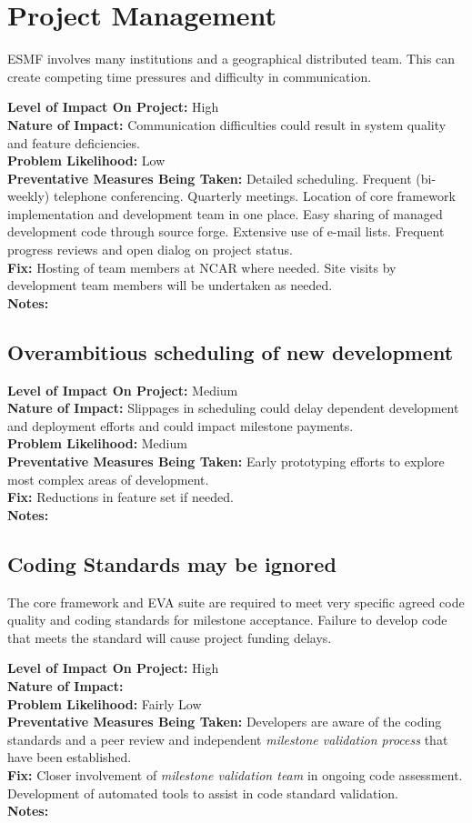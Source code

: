 \documentclass[english]{article}
\newcommand{\req}[1]{\section{\hspace{.2in}#1}}
\newcommand{\sreq}[1]{\subsection{\hspace{.2in}#1}}
\newenvironment
{reqlist}
{\begin{list} {} {} \rm \item[]}
{\end{list}}
\begin{document}
\req{Project Management}
ESMF involves many institutions and a geographical distributed team. 
This can create competing time pressures and difficulty in communication.

\begin{reqlist}
{\bf Level of Impact On Project:} High \\
{\bf Nature of Impact:} Communication difficulties could result in system quality and feature deficiencies. \\
{\bf Problem Likelihood:} Low \\
{\bf Preventative Measures Being Taken:} Detailed scheduling. Frequent (bi-weekly) telephone
conferencing. Quarterly meetings. Location of core framework implementation and development
team in one place. Easy sharing of managed development code through source forge. 
Extensive use of e-mail lists. Frequent progress reviews and open dialog on project status.
\\
{\bf Fix:} Hosting of team members at NCAR where needed.
Site visits by development team members will be undertaken as needed.
\\
{\bf Notes:} 
\end{reqlist}

\sreq{Overambitious scheduling of new development}
\begin{reqlist}
{\bf Level of Impact On Project:} Medium \\
{\bf Nature of Impact:} Slippages in scheduling could delay dependent development and deployment efforts and could impact milestone payments.  \\
{\bf Problem Likelihood:} Medium \\
{\bf Preventative Measures Being Taken:} Early prototyping efforts to explore most
complex areas of development.
\\
{\bf Fix:} Reductions in feature set if needed.
\\
{\bf Notes:} 
\end{reqlist}


\sreq{Coding Standards may be ignored}
The core framework and EVA suite are required to meet very specific agreed code quality and coding
standards for milestone acceptance. Failure to develop code that meets the
standard will cause project funding delays.
\begin{reqlist}
{\bf Level of Impact On Project:} High \\
{\bf Nature of Impact:} \\
{\bf Problem Likelihood:} Fairly Low \\
{\bf Preventative Measures Being Taken:} Developers are aware of the
coding standards and a peer review and independent {\it milestone validation process}
that have been established.
\\
{\bf Fix:} Closer involvement of {\it milestone validation team} in ongoing code 
assessment. Development of automated tools to assist in code standard validation.
\\
{\bf Notes:} 
\end{reqlist}
\end{document}
